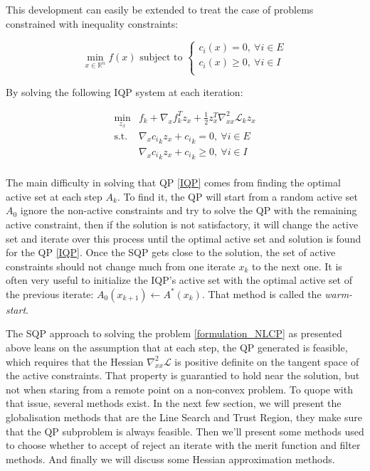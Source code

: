 This development can easily be extended to treat the case of problems constrained with inequality constraints:

\begin{equation}
  \min_{x\in\mathbb{R}^n}{f(x)} \text{ subject to }
  \left\{
  \begin{array}{l}
    c_i(x) = 0,\ \forall i\in{E}\\
    c_i(x) \geq 0,\ \forall i\in{I}\\
  \end{array}
  \right.
\end{equation}

By solving the following IQP system at each iteration:

\begin{equation}
  \label{IQP}
  \begin{array}{ll}
    \min_{z_x} &f_k + \nabla_x f_k ^T z_x + \frac{1}{2} z_x^T\nabla_{xx}^2\mathcal{L}_k z_x \\
    \text{s.t.} & \nabla_x {c_i}_k z_x + {c_i}_k = 0 ,\ \forall i\in E\\
                & \nabla_x {c_i}_k z_x + {c_i}_k \geq 0 ,\ \forall i\in I\\
  \end{array}
\end{equation}

The main difficulty in solving that QP \ref{IQP} comes from finding the optimal active set at each step $\mathit{A}_k$.
To find it, the QP will start from a random active set $\mathit{A}_0$ ignore the non-active constraints and try to solve the QP with the remaining active constraint, then if the solution is not satisfactory, it will change the active set and iterate over this process until the optimal active set and solution is found for the QP \ref{IQP}.
Once the SQP gets close to the solution, the set of active constraints should not change much from one iterate $x_k$ to the next one.
It is often very useful to initialize the IQP's active set with the optimal active set of the previous iterate: $\mathit{A}_0(x_{k+1})\leftarrow\mathit{A}^*(x_k)$.
That method is called the \textit{warm-start}.

The SQP approach to solving the problem \ref{formulation_NLCP} as presented above leans on the assumption that at each step, the QP generated is feasible,
which requires that the Hessian $\nabla_{xx}^2\mathcal{L}$ is positive definite on the tangent space of the active constraints.
That property is guarantied to hold near the solution, but not when staring from a remote point on a non-convex problem.
To quope with that issue, several methods exist.
In the next few section, we will present the globalisation methods that are the Line Search and Trust Region, they make sure that the QP subproblem is always feasible.
Then we'll present some methods used to choose whether to accept of reject an iterate with the merit function and filter methods.
And finally we will discuss some Hessian approximation methods.

